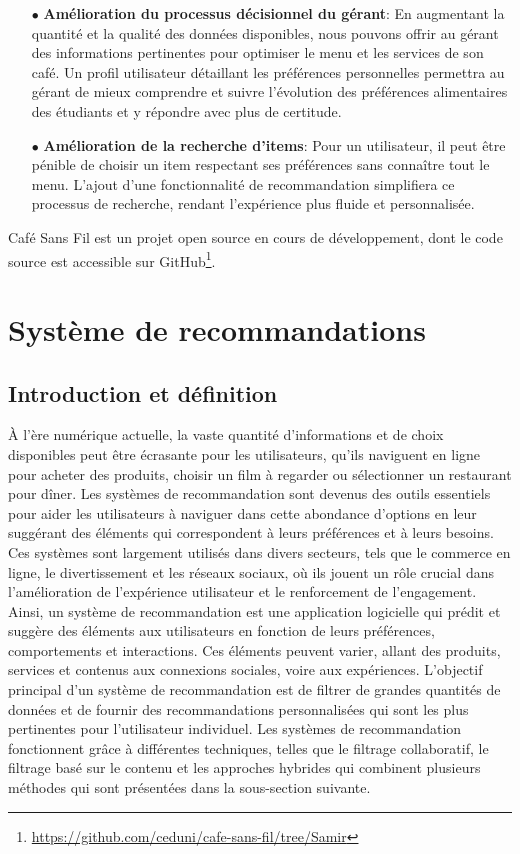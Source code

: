 \documentclass[11pt]{article}
\begin{document}
\begin{itemize}
	\item[$\bullet$] \textbf{Amélioration du processus décisionnel du gérant}:
    En augmentant la quantité et la qualité des données disponibles, nous pouvons offrir au gérant des informations pertinentes pour optimiser le menu et les services de son café. 
    Un profil utilisateur détaillant les préférences personnelles permettra au gérant de mieux comprendre et suivre l'évolution des préférences alimentaires des étudiants et y répondre avec plus de certitude.
	
	\item[$\bullet$] \textbf{Amélioration de la recherche d'items}: 
    Pour un utilisateur, il peut être pénible de choisir un item respectant ses préférences sans connaître tout le menu. 
    L'ajout d'une fonctionnalité de recommandation simplifiera ce processus de recherche, rendant l'expérience plus fluide et personnalisée.\\
\end{itemize}

Café Sans Fil est un projet open source en cours de développement, dont le code source est accessible sur GitHub\footnote{\url{https://github.com/ceduni/cafe-sans-fil/tree/Samir}}.


\newpage

\section{Système de recommandations}
\subsection{Introduction et définition}
À l'ère numérique actuelle, la vaste quantité d'informations et de choix disponibles peut être écrasante pour les utilisateurs, qu'ils naviguent en ligne pour acheter des produits, choisir un film à regarder ou sélectionner un restaurant pour dîner. Les systèmes de recommandation sont devenus des outils essentiels pour aider les utilisateurs à naviguer dans cette abondance d'options en leur suggérant des éléments qui correspondent à leurs préférences et à leurs besoins. Ces systèmes sont largement utilisés dans divers secteurs, tels que le commerce en ligne, le divertissement et les réseaux sociaux, où ils jouent un rôle crucial dans l'amélioration de l'expérience utilisateur et le renforcement de l'engagement.\\

Ainsi, un système de recommandation est une application logicielle qui prédit et suggère des éléments aux utilisateurs en fonction de leurs préférences, comportements et interactions. Ces éléments peuvent varier, allant des produits, services et contenus aux connexions sociales, voire aux expériences. L'objectif principal d'un système de recommandation est de filtrer de grandes quantités de données et de fournir des recommandations personnalisées qui sont les plus pertinentes pour l'utilisateur individuel.
Les systèmes de recommandation fonctionnent grâce à différentes techniques, telles que le filtrage collaboratif, le filtrage basé sur le contenu et les approches hybrides qui combinent plusieurs méthodes qui sont présentées dans la sous-section suivante.
\end{document}

